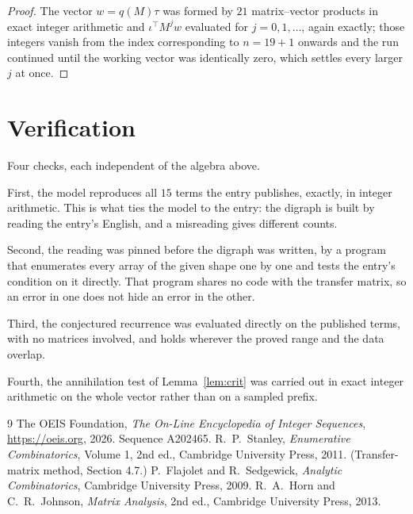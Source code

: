 \documentclass[11pt,a4paper]{article}
\theoremstyle{plain}
\theoremstyle{definition}
\begin{document}
\begin{proof}
The vector $w=q(M)\tau$ was formed by $21$ matrix--vector products in exact integer
arithmetic and $\iota^{\!\top}M^{j}w$ evaluated for $j=0,1,\dots$, again exactly; those
integers vanish from the index corresponding to $n=19+1$ onwards and the run continued
until the working vector was identically zero, which settles every larger $j$ at once.
\end{proof}

\section{Verification}

Four checks, each independent of the algebra above.

First, the model reproduces all $15$ terms the entry publishes, exactly, in integer
arithmetic. This is what ties the model to the entry: the digraph is built by reading the
entry's English, and a misreading gives different counts.

Second, the reading was pinned before the digraph was written, by a program that enumerates
every array of the given shape one by one and tests the entry's condition on it directly. That program shares no code with the transfer matrix, so an error in one does not
hide an error in the other.

Third, the conjectured recurrence was evaluated directly on the published terms, with no
matrices involved, and holds wherever the proved range and the data overlap.

Fourth, the annihilation test of Lemma~\ref{lem:crit} was carried out in exact integer
arithmetic on the whole vector rather than on a sampled prefix.

\begin{thebibliography}{9}
 The OEIS Foundation, \emph{The On-Line Encyclopedia of Integer
Sequences}, \url{https://oeis.org}, 2026. Sequence A202465.
 R.~P.~Stanley, \emph{Enumerative Combinatorics}, Volume 1, 2nd ed.,
Cambridge University Press, 2011. (Transfer-matrix method, Section 4.7.)
 P.~Flajolet and R.~Sedgewick, \emph{Analytic Combinatorics}, Cambridge
University Press, 2009.
 R.~A.~Horn and C.~R.~Johnson, \emph{Matrix Analysis}, 2nd ed., Cambridge
University Press, 2013.
\end{thebibliography}
\end{document}
